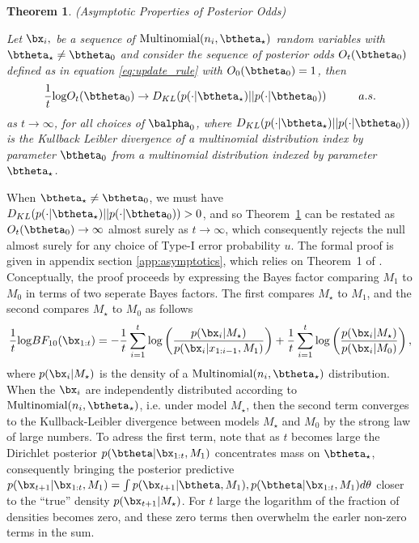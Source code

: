 \documentclass[11pt]{article}
\def\log{{\rm log}}
\newtheorem{thm}{Theorem}[section]
\begin{document}
\begin{thm}(Asymptotic Properties of Posterior Odds)
  
  \label{thm:consistency}
\noindent Let $\bx_i,$ be a sequence of $\text{Multinomial}(n_i,\btheta_{\star})$ random variables with $\btheta_{\star} \neq \btheta_0$ and consider the sequence of posterior odds $O_t(\btheta_0)$ defined as in equation \eqref{eq:update_rule} with $O_0(\btheta_0)=1$, then
\begin{equation}
  \label{eq:consistency}
  \frac{1}{t} \log O_t(\btheta_0) \rightarrow D_{KL}(p(\cdot|\btheta_{\star}) || p(\cdot|\btheta_0)) \hspace{1cm} a.s.
\end{equation}
as $t \rightarrow \infty$, for all choices of $\balpha_0$, where $D_{KL}(p(\cdot|\btheta_{\star}) || p(\cdot|\btheta_0))$ is the Kullback Leibler divergence of a multinomial distribution index by parameter $\btheta_0$ from a multinomial distribution indexed by parameter $\btheta_{\star}$.

\end{thm}
\noindent When $\btheta_{\star} \neq \btheta_0$, we must have $D_{KL}(p(\cdot|\btheta_{\star}) || p(\cdot|\btheta_0)) > 0$, and so Theorem~\ref{thm:consistency} can be restated as $O_t(\btheta_0) \rightarrow \infty$ almost surely as $t \rightarrow \infty$, which consequently rejects the null almost surely for any choice of Type-I error probability $u$.
The formal proof is given in appendix section \ref{app:asymptotics}, which relies on Theorem~1 of \cite{walker}.
Conceptually, the proof proceeds by expressing the Bayes factor comparing $M_1$ to $M_0$ in terms of two seperate Bayes factors.
The first compares $M_{\star}$ to $M_1$, and the second compares $M_{\star}$ to $M_0$ as follows
\begin{align*}
 \frac{1}{t} \log BF_{10}(\bx_{1:t}) = - \frac{1}{t}\sum_{i=1}^{t}\log \left( \frac{p(\bx_{i}|M_\star)}{p(\bx_{i}|x_{1:i-1},M_1)}\right) + \frac{1}{t}\sum_{i=1}^{t} \log  \left( \frac{p(\bx_{i}|M_\star)}{p(\bx_{i}|M_0)}\right),\\
\end{align*}
where  $p(\bx_i|M_\star)$ is the density of a $\text{Multinomial}(n_i,\btheta_{\star})$ distribution.
When the $\bx_i$ are independently distributed according to $\text{Multinomial}(n_i, \btheta_\star)$, i.e.
under model $M_\star$, then the second term converges to the Kullback-Leibler divergence between models $M_\star$ and $M_0$ by the strong law of large numbers.
To adress the first term, note that as $t$ becomes large the Dirichlet posterior $p(\btheta|\bx_{1:t}, M_1)$ concentrates mass on $\btheta_\star$, consequently bringing the posterior predictive $p(\bx_{t+1}|\bx_{1:t},M_1) =\int p(\bx_{t+1}|\btheta,M_1),p(\btheta|\bx_{1:t},M_1) d\theta$ closer to the ``true'' density $p(\bx_{t+1}|M_{\star})$.
For $t$ large the logarithm of the fraction of densities becomes zero, and these zero terms then overwhelm the earler non-zero terms in the sum.
\end{document}
